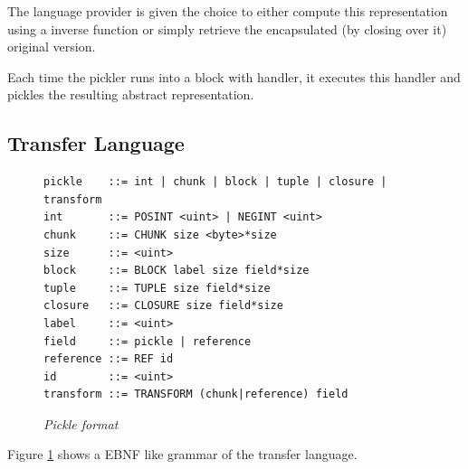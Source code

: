The language provider is given the choice to either compute
this representation using a inverse function or simply retrieve
the encapsulated (by closing over it) original version.

Each time the pickler runs into a block with handler,
it executes this handler and pickles the resulting
abstract representation.
\subsection{Transfer Language}
\begin{figure}[ht]
\begin{verbatim}
pickle    ::= int | chunk | block | tuple | closure | transform
int       ::= POSINT <uint> | NEGINT <uint>
chunk     ::= CHUNK size <byte>*size
size      ::= <uint>
block     ::= BLOCK label size field*size
tuple     ::= TUPLE size field*size
closure   ::= CLOSURE size field*size
label     ::= <uint>
field     ::= pickle | reference
reference ::= REF id
id        ::= <uint>
transform ::= TRANSFORM (chunk|reference) field
\end{verbatim}
\caption{\label{pickle_lang} {\it Pickle format}}
\end{figure}
Figure \ref{pickle_lang} shows a EBNF like grammar of the transfer
language. 
